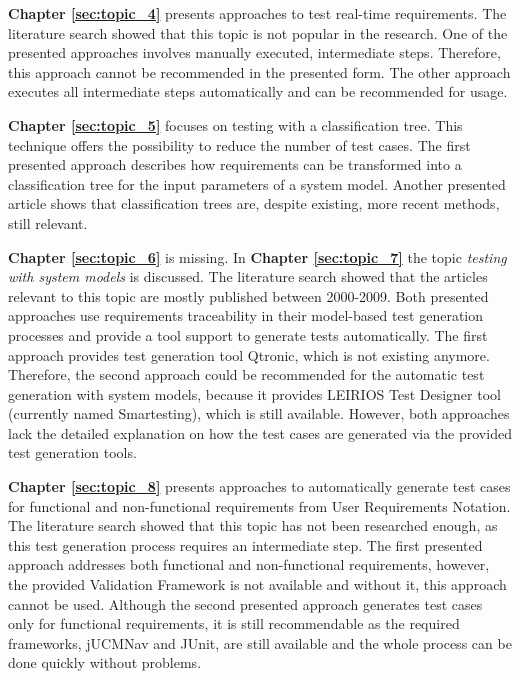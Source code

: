 \textbf{Chapter \ref{sec:topic_4}} presents approaches to test real-time requirements. The literature search showed that this topic is not popular in the research. One of the presented approaches \cite{Siegl2010} involves manually executed, intermediate steps. Therefore, this approach cannot be recommended in the presented form. The other approach \cite{Guan2015} executes all intermediate steps automatically and can be recommended for usage.

\textbf{Chapter \ref{sec:topic_5}} focuses on testing with a classification tree. This technique offers the possibility to reduce the number of test cases. The first presented approach \cite{Conrad2005} describes how requirements can be transformed into a classification tree for the input parameters of a system model. Another presented article \cite{Belli2009} shows that classification trees are, despite existing, more recent methods, still relevant.

\textbf{Chapter \ref{sec:topic_6}} is missing.
\newpage
In \textbf{Chapter \ref{sec:topic_7}} the topic \textit{testing with system models} is discussed. The literature search showed that the articles relevant to this topic are mostly published between 2000-2009. Both presented approaches use requirements traceability in their model-based test generation processes and provide a tool support to generate tests automatically. The first approach \cite{Paper1} provides test generation tool Qtronic, which is not existing anymore. Therefore, the second approach \cite{Paper2} could be recommended for the automatic test generation with system models, because it provides LEIRIOS Test Designer tool (currently named Smartesting), which is still available. However, both approaches lack the detailed explanation on how the test cases are generated via the provided test generation tools.

\textbf{Chapter \ref{sec:topic_8}} presents approaches to automatically generate test cases for functional and non-functional requirements from User Requirements Notation. The literature search showed that this topic has not been researched enough, as this test generation process requires an intermediate step. The first presented approach \cite{ArnoldCorriveauShi2010} addresses both functional and non-functional requirements, however, the provided Validation Framework is not available and without it, this approach cannot be used. Although the second presented approach \cite{BoucherMussbacher2017} generates test cases only for functional requirements, it is still recommendable as the required frameworks, jUCMNav and JUnit, are still available and the whole process can be done quickly without problems. 

